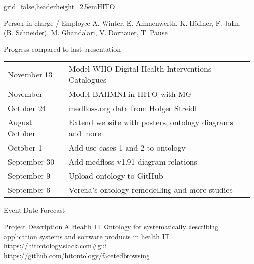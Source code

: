 \documentclass[english]{kiesgrube}
\begin{document}
\newcommand{\footer}[0]{\tikz{\draw (image.south west) node[anchor=west]{IMISE | MIG | Konrad Höffner | 2019-11-18};}}

\begin{poster}{grid=false,headerheight=2.5em}{}{HITO}{}{}
\begin{posterbox}[name=person,column=0,row=0]{Person in charge / Employee}
A. Winter, E. Ammenwerth, K. Höffner, F. Jahn, (B. Schneider), M. Ghandalari, V. Dornauer, T. Pause
\end{posterbox}
\begin{posterbox}[name=progress,below=person]{Progress compared to last presentation}
\begin{tabulary}{\columnwidth}{lL}
November 13	&Model WHO Digital Health Interventions Catalogues\\
November	&Model BAHMNI in HITO with MG\\
October 24	&medfloss.org data from Holger Streidl\\
August--October	&Extend website with posters, ontology diagrams and more\\
October 1	&Add use cases 1 and 2 to ontology\\
September 30	&Add medfloss v1.91 diagram relations \\
September 9	&Upload ontology to GitHub\\
September 6	&Verena's ontology remodelling and more studies\\
\end{tabulary}
\end{posterbox}
\begin{posterbox}[name=event,below=progress]{Event Date Forecast}
\end{posterbox}
\begin{posterbox}[name=description,column=1,row=0]{Project Description}
A Health IT Ontology for systematically describing application systems and software products in health IT.\\
\url{https://hitontology.slack.com#gui}\\
\url{https://github.com/hitontology/facetedbrowsing}

\end{posterbox}
\end{poster}
\end{document}
